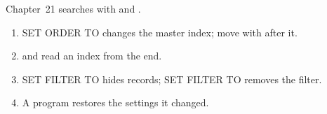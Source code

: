 Chapter~21 searches with  and .

\begin{enumerate}
\item SET ORDER TO  changes the master index; move with  after it.
\item {} and  read an index from the end.
\item SET FILTER TO  hides records; SET FILTER TO removes the filter.
\item A program restores the settings it changed.
\end{enumerate}
